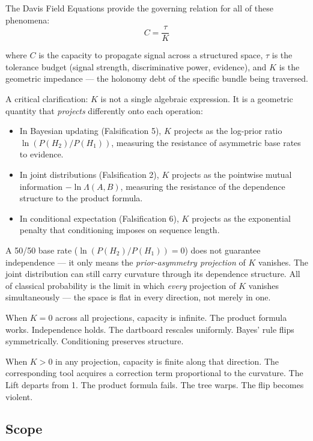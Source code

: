 \documentclass[12pt]{article}
\begin{document}
The Davis Field Equations \cite{davis2025field} provide the governing relation for all of these phenomena:
\begin{equation}
C = \frac{\tau}{K}
\end{equation}

where $C$ is the capacity to propagate signal across a structured space, $\tau$ is the tolerance budget (signal strength, discriminative power, evidence), and $K$ is the geometric impedance --- the holonomy debt of the specific bundle being traversed.

A critical clarification: $K$ is not a single algebraic expression. It is a geometric quantity that \textit{projects} differently onto each operation:
\begin{itemize}[nosep]
\item In Bayesian updating (Falsification 5), $K$ projects as the log-prior ratio $\ln(P(H_2)/P(H_1))$, measuring the resistance of asymmetric base rates to evidence.
\item In joint distributions (Falsification 2), $K$ projects as the pointwise mutual information $-\ln \Lambda(A,B)$, measuring the resistance of the dependence structure to the product formula.
\item In conditional expectation (Falsification 6), $K$ projects as the exponential penalty that conditioning imposes on sequence length.
\end{itemize}

A 50/50 base rate ($\ln(P(H_2)/P(H_1)) = 0$) does not guarantee independence --- it only means the \textit{prior-asymmetry projection} of $K$ vanishes. The joint distribution can still carry curvature through its dependence structure. All of classical probability is the limit in which \textit{every} projection of $K$ vanishes simultaneously --- the space is flat in every direction, not merely in one.

When $K = 0$ across all projections, capacity is infinite. The product formula works. Independence holds. The dartboard rescales uniformly. Bayes' rule flips symmetrically. Conditioning preserves structure.

When $K > 0$ in any projection, capacity is finite along that direction. The corresponding tool acquires a correction term proportional to the curvature. The Lift departs from 1. The product formula fails. The tree warps. The flip becomes violent.

\subsection{Scope}
\end{document}
